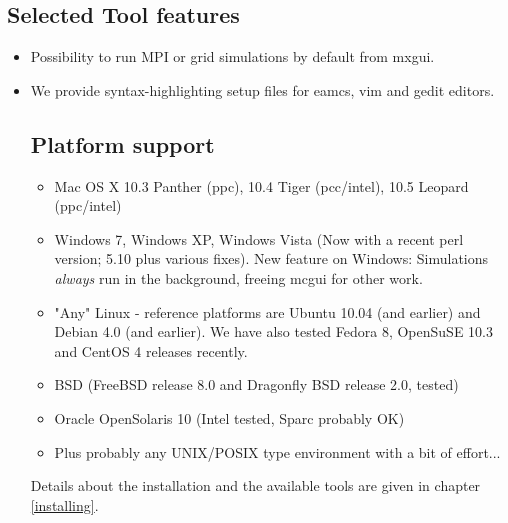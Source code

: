 \subsection{Selected Tool features}
\begin{itemize}
  \item Possibility to run MPI or grid simulations by default from mxgui.
  \item We provide syntax-highlighting setup files for eamcs, vim and gedit editors.
\subsection{Platform support}
\begin{itemize}
\item Mac OS X 10.3 Panther (ppc), 10.4 Tiger (pcc/intel), 10.5 Leopard (ppc/intel)
\item Windows 7, Windows XP,  Windows Vista (Now with a recent perl version; 5.10 plus various fixes). New feature on Windows:
     Simulations \emph{always} run in the background, freeing mcgui for other work.
\item "Any" Linux - reference platforms are Ubuntu 10.04 (and earlier) and Debian 4.0 (and earlier). We have also tested 
  Fedora 8, OpenSuSE 10.3 and CentOS 4 releases recently.
\item BSD (FreeBSD release 8.0 and Dragonfly BSD release 2.0, tested)
\item Oracle OpenSolaris 10 (Intel tested, Sparc probably OK)
\item Plus probably any UNIX/POSIX type environment with a bit of effort...
\end{itemize}
Details about the installation and the available tools are given in chapter \ref{installing}.


\end{itemize}
